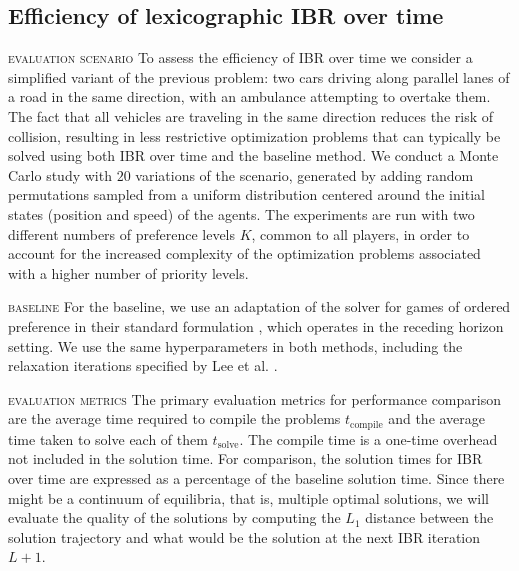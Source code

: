 \subsection{Efficiency of lexicographic IBR over time}

\noindent
\textsc{evaluation scenario} \quad
To assess the efficiency of IBR over time
we consider a simplified variant of the previous problem:
two cars driving along parallel lanes
of a road in the same direction,
with an ambulance attempting to overtake them.
The fact that all vehicles are traveling
in the same direction reduces the risk of collision, resulting
in less restrictive optimization problems
that can typically be solved
using both IBR over time and the baseline method.
We conduct a Monte Carlo study with \(20\) variations
of the scenario, generated by adding random permutations sampled
from a uniform distribution centered
around the initial states (position and speed) of the agents.
The experiments are run with two different numbers
of preference levels \(K\), common to all players,
in order to account for the increased complexity
of the optimization problems associated
with a higher number of priority levels.

\smallskip \noindent
\textsc{baseline} \quad
For the baseline, we use an adaptation
of the solver for games of ordered preference
in their standard formulation \cite{lee:2025},
which operates in the receding horizon setting.
We use the same hyperparameters in both methods,
including the relaxation iterations specified by Lee et al. \cite{lee:2025}.

\smallskip \noindent
\textsc{evaluation metrics} \quad
The primary evaluation metrics
for performance comparison are the average time required
to compile the problems \(t_\text{compile}\) and the average time taken
to solve each of them \(t_\text{solve}\).
The compile time is a one-time overhead not included in the solution time.
For comparison, the solution times for IBR
over time are expressed as a percentage
of the baseline solution time.
Since there might be a continuum of equilibria, that is, multiple optimal solutions, we will evaluate the quality of the solutions by
computing the \(L_1\) distance between the solution trajectory and what would be the solution at the next IBR iteration \(L+1\).

